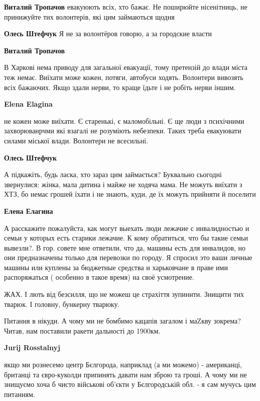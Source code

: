 \begin{itemize}
\begin{itemize}
\textbf{Виталий Тропачов} евакуюють всіх, хто бажає. Не поширюйте нісенітниць, не принижуйте тих волонтерів, які цим займаються щодня

\textbf{Олесь Штефчук} Я не за волонтёров говорю, а за городские власти

\textbf{Виталий Тропачов} 

В Харкові нема приводу для загальної евакуації, тому претензій до влади міста
теж немає. Виїхати може кожен, потяги, автобуси ходять. Волонтери вивозять всіх
бажаючих. Якщо здали нерви, то краще їдьте і не робіть нерви іншим.

\textbf{Elena Elagina} 

не кожен може виїхати. Є старенькі, є маломобільні. Є ще люди з психічними
захворюванрчми які взагалі не розуміють небезпеки. Таких треба евакуювати
силами міської влади. Волонтери не всесильні.

\textbf{Олесь Штефчук} 

А підкажіть, будь ласка, хто зараз цим займається? Буквально сьогодні
звернулися: жінка, мала дитина і майже не ходяча мама. Не можуть виїхати з ХТЗ,
бо немає грошей їхати і не знають, куди, де їх можуть прийняти й поселити

\textbf{Елена Елагина} 

А расскажите пожалуйста, как могут выехать люди лежачие с инвалидностью и семьи
у которых есть старики лежачие. К кому обратиться, что бы такие семьи вывезли?.
В гор. совете мне ответили, что да, машины есть для инвалидов, но они
предназначены только для перевозки по городу. Я спросил это ваши личные машины
или куплены за бюджетные средства и харьковчане в праве ими распоряжаться (
особенно в такое время) на своё усмотрение.

\end{itemize} %


ЖАХ. І лють від безсилля, що не можеш це страхіття зупинити. Знищити тих
тварюк. І головну, бункерну тварюку.

Питання в нікуди. А чому ми не бомбимо кацапів загалом і маZкву зокрема? Читав,
нам поставили ракети дальності до 1900км.

\begin{itemize} %
\textbf{Jurij Rosstalnyj} 

якщо ми рознесемо центр Бєлгорода, наприклад (а ми можемо) - американці,
британці та євро-куколди припинять давати нам зброю та гроші. А чому ми не
знищуємо хоча б чисто військові об'єкти у Бєлгородській обл. - я сам мучусь цим
питанням.


\end{itemize}
\end{itemize}
